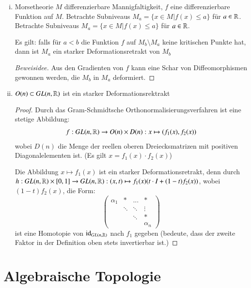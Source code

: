 \documentclass[a4paper,10pt]{scrartcl}
\begin{document}
\begin{exs*}
\begin{enumerate}[(i)]
 \item 
\begin{seg}{Morsetheorie} 
$M$ differenzierbare Mannigfaltigkeit, $f$ eine differenzierbare Funktion auf $M$. Betrachte Subniveaus $M_a=\{x\in M|f(x)\le a\}$ für $a\in \mathbb{R}$.
Betrachte Subniveaus $M_a=\{x\in M|f(x)\le a\}$ für $a\in \mathbb{R}$.
 \begin{figure}[H]
\centering
 \fixme[fig47]
\caption{}
\end{figure}
Es gilt: falls für $a<b$ die Funktion $f$ auf $M_b\setminus M_a$ keine kritischen Punkte hat, dann ist $M_a$ ein starker Deformationsretrakt von $M_{b}$
\end{seg}
\begin{proof}[Beweisidee]
 Aus den Gradienten von $f$ kann eine Schar von Diffeomorphismen gewonnen werden, die $M_b$ in $M_a$ deformiert.
\end{proof}
\item $O(n)\subset GL(n, \mathbb{R})$ ist ein starker Deformationsrektrakt
\begin{proof}
 Durch das Gram-Schmidtsche Orthonormalisierungsverfahren ist eine stetige Abbildung:
\[
 f: GL(n,\mathbb{R})\to O(n)\times D(n): x\mapsto (f_1(x), f_2(x))
\]
wobei $D(n)$ die Menge der reellen oberen Dreiecksmatrizen mit positiven Diagonalelementen ist. (Es gilt $x=f_1(x)\cdot f_2(x)$)

Die Abbildung $x\mapsto f_1(x)$ ist ein starker Deformationsretrakt, denn durch $h: GL(n,\mathbb{R})\times [0,1]\to GL(n,\mathbb{R}): (x,t)\mapsto f_1(x)(t\cdot I+(1-t)f_2(x))$, wobei $(1-t)f_2(x)$, die Form:
 \[
  \begin{pmatrix}
   \alpha_1 & * & ...& *\\
 & \ddots & \ddots & \vdots\\
 & & \ddots & *\\
 & & & \alpha_n
  \end{pmatrix}
 \]
ist eine Homotopie von $\operatorname{id}_{GL(n, \mathbb{R})}$ nach $f_1$ gegeben (bedeute, dass der zweite Faktor in der Definition oben stets invertierbar ist.)
\end{proof}
\end{enumerate}
\end{exs*}
\section{Algebraische Topologie}
\end{document}
